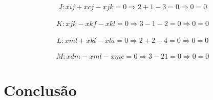 \documentclass[a4paper]{report}
\begin{document}
\begin{multline}
J: xij + xcj - xjk = 0
\Rightarrow 2 + 1 - 3 = 0
\Rightarrow 0 = 0
\end{multline}

\begin{multline}
K: xjk - xkf - xkl = 0
\Rightarrow 3 - 1 - 2 = 0
\Rightarrow 0 = 0
\end{multline}

\begin{multline}
L: xml + xkl - xla = 0
\Rightarrow 2 + 2 - 4 = 0
\Rightarrow 0 = 0
\end{multline}

\begin{multline}
M: xdm - xml - xme = 0
\Rightarrow 3 - 2 1 = 0
\Rightarrow 0 = 0
\end{multline}

\chapter{Conclusão}
\end{document}
